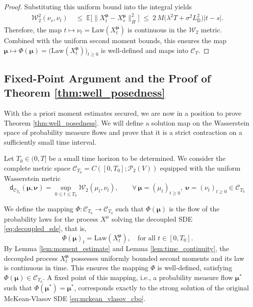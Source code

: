 \documentclass[12pt]{amsart}
\numberwithin{equation}{section}
\begin{document}
\begin{proof}
Substituting this uniform bound into the integral yields
\begin{equation*}
\begin{aligned}
    \mathcal{W}_2^2(\nu_s, \nu_t) 
    & \;\leq\; \mathbb{E}\big[\|X^{\bm{\mu}}_t - X^{\bm{\mu}}_s\|_H^2\big]\; \leq\; 2\,M \big( \lambda^2 T + \sigma^2 L_{\mathsf{D}}^2 \big) |t-s|. %
\end{aligned}
\end{equation*}
Therefore, the map $t \mapsto \nu_t=\mathrm{Law}(X^{\bm{\mu}}_t)$ is continuous in the $\mathcal{W}_2$ metric. Combined with the uniform second moment bounds, this ensures the map $\bm{\mu} \mapsto \Phi({\bm{\mu}}) = \big(\mathrm{Law}(X^{\bm{\mu}}_t)\big)_{t\geq 0}$ is well-defined and maps into $\mathscr{C}_T$. 
\end{proof}



\subsection{Fixed-Point Argument and the Proof of Theorem \ref{thm:well_posedness}}
\label{sec:contraction_proof}

With the a priori moment estimates secured, we are now in a position to prove Theorem \ref{thm:well_posedness}. We will define a solution map on the Wasserstein space of probability measure flows and prove that it is a strict contraction on a sufficiently small time interval. 


Let $T_0 \in (0, T]$ be a small time horizon to be determined. We consider the complete metric space $\mathscr{C}_{T_0} = C([0,T_0]; \mathscr{P}_2(V))$ equipped with the uniform Wasserstein metric 
\begin{equation}
    \mathsf{d}_{\mathscr{C}_{T_0}}(\bm{\mu}, \bm{\nu}) = \sup_{0 \leq t \leq T_0} \mathcal{W}_2(\mu_t, \nu_t), \qquad \forall\, \bm{\mu}=(\mu_t)_{t\geq 0}, \;\bm{\nu} = (\nu_{t})_{t\geq 0} \in \mathscr{C}_{T_{0}}
\end{equation}

We define the mapping $\Phi: \mathscr{C}_{T_0} \longrightarrow \mathscr{C}_{T_0}$ such that $\Phi(\bm{\mu})$ is the flow of the probability laws for the process $X^\mu$ solving the decoupled SDE \eqref{eq:decoupled_sde}, that is,
\begin{equation*}
    \Phi({\bm{\mu}})_t = \mathrm{Law}(X^{\bm{\mu}}_t), \quad \text{for all } t \in [0,T_0].
\end{equation*}
By Lemma \ref{lem:moment_estimate} and Lemma \ref{lem:time_continuity}, the decoupled process $X^{\bm{\mu}}_t$ possesses uniformly bounded second moments and its law is continuous in time. This ensures the mapping $\Phi$ is well-defined, satisfying $\Phi({\bm{\mu}}) \in \mathscr{C}_{T_0}$. A fixed point of this mapping, i.e., a probability measure flow ${\bm{\mu}}^*$ such that $\Phi({\bm{\mu}}^*) = {\bm{\mu}}^*$, corresponds exactly to the strong solution of the original McKean-Vlasov SDE \eqref{eq:mckean_vlasov_cbo}.
\end{document}
